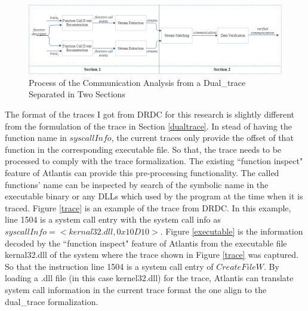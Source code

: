 \begin{figure}[H]
\centerline{\includegraphics[scale=0.55]{Figures/overviewintwo}}
\caption{Process of the Communication Analysis from a Dual\_trace Separated in Two Sections}
\label{overviewintwo}
\end{figure}

The format of the traces I got from DRDC for this research is slightly different from the formulation of the trace in Section \ref{dualtrace}. In stead of having the function name in $syscallInfo$, the current traces only provide the offset of that function in the corresponding executable file. So that, the trace needs to be processed to comply with the trace formalization.
The existing ``function inspect" feature of Atlantis can provide this pre-processing functionality. The called functions' name can be inspected  by  search of the symbolic name in the executable binary or any DLLs which used by the program at the time when it is traced. Figure \ref{trace} is an example of the trace from DRDC. In this example, line 1504 is a system call entry with the system call info as $syscallInfo = <kernal32.dll, 0x10D10>$. 
Figure \ref{executable} is the information decoded by the ``function inspect" feature of Atlantis from the executable file kernal32.dll of the system where the trace shown in Figure \ref{trace} was captured. So that the instruction line 1504 is a system call entry of $CreateFileW$. By loading a .dll file (in this case kernel32.dll) for the trace, Atlantis can translate system call information in the current trace format the one align to the dual\_trace formalization.


